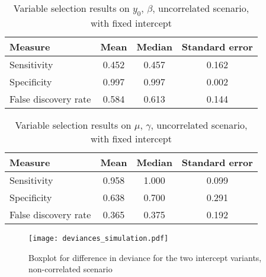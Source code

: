 \begin{table}\caption{Variable selection results on $y_0$, $\beta$, uncorrelated scenario, with fixed intercept}
\label{table:non-correlated-no-intercept-y0}
\centering
\begin{tabular}{lccc}
\toprule
Measure &  Mean &  Median &   Standard error \\
\hline
Sensitivity & 0.452 &  0.457 & 0.162 \\
Specificity & 0.997 &  0.997 & 0.002 \\
False discovery rate & 0.584 &  0.613 & 0.144 \\
\bottomrule
\end{tabular}
\end{table}


\begin{table}\caption{Variable selection results on $\mu$, $\gamma$, uncorrelated scenario, with fixed intercept}\label{table:non-correlated-no-intercept-mu}
\centering
\begin{tabular}{lccc}
\toprule
Measure &  Mean & Median & Standard error \\
\hline
Sensitivity & 0.958 &  1.000 & 0.099 \\
Specificity & 0.638 &  0.700 & 0.291 \\
False discovery rate & 0.365 &  0.375 & 0.192 \\
\bottomrule
\end{tabular}
\end{table}

\begin{figure}\label{fig:simulation-not-correlated-deviances-boxplot}
\caption{Boxplot for difference in deviance for the two intercept variants, non-correlated scenario}
\centering\texttt{[image: deviances\_simulation.pdf]}
\end{figure}

